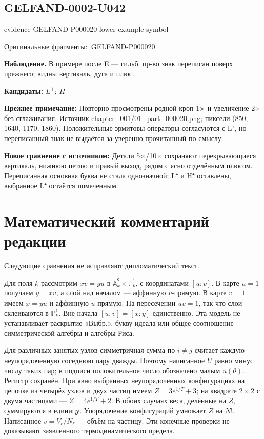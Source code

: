 \documentclass[11pt]{article}
\newcommand{\EvidenceBlock}[4]{%
 \par\smallskip\noindent\begin{minipage}{\linewidth}
 \begin{minipage}[t]{.47\linewidth}\vspace{0pt}\centering
 \csname evidence-#1-#2\endcsname\par
 {\scriptsize\SourceCropCaption\ #1}\par
 \end{minipage}\hfill
 \begin{minipage}[t]{.49\linewidth}\vspace{0pt}\raggedright
 {\small\color{orange!65!black}\textbf{#4} #3}\par
 \end{minipage}
 \end{minipage}\par\smallskip}
\newcommand{\SourceCropCaption}{Оригинальные фрагменты:}\newcommand{\ReadingCaption}{Сомнительное чтение.}\newcommand{\IncompleteCaption}{Неразобранный фрагмент.}\newcommand{\DiagramCaption}{Рисунок и набранное описание.}
\begin{document}
\subsection*{GELFAND-0002-U042}
\EvidenceBlock{GELFAND-P000020}{lower-example-symbol}{В примере после E — гильб. пр-во знак переписан поверх прежнего; видны вертикаль, дуга и плюс.}{Наблюдение.}
\par\smallskip\noindent\textbf{Кандидаты: } \(L^+\); \(H^+\)\par
\par\smallskip\noindent\textbf{Прежнее примечание: } Повторно просмотрены родной кроп 1× и увеличение 2× без сглаживания. Источник chapter\_001/01\_part\_000020.png; пиксели (850, 1640, 1170, 1860). Положительные эрмитовы операторы согласуются с L⁺, но переписанный знак не выдаётся за уверенно прочитанный по смыслу.\par
\par\smallskip\noindent\textbf{Новое сравнение с источником: } Детали 5×/10× сохраняют перекрывающиеся вертикаль, нижнюю петлю и правый выход, рядом с ясно отделённым плюсом. Переписанная основная буква не стала однозначной; L⁺ и H⁺ оставлены, выбранное L⁺ остаётся помеченным.\par
\clearpage\section*{Математический комментарий редакции}
Следующие сравнения не исправляют дипломатический текст.

Для поля \(k\) рассмотрим \(xv=yu\) в \(\mathbb A^2_k\times\mathbb P^1_k\), с координатами \([u:v]\). В карте \(u=1\) получаем \(y=xv\), а слой над началом — аффинную \(v\)-прямую. В карте \(v=1\) имеем \(x=yu\) и аффинную \(u\)-прямую. На пересечении \(uv=1\), так что слои склеиваются в \(\mathbb P^1_k\). Вне начала \([u:v]=[x:y]\) единственно. Эта модель не устанавливает раскрытие «Выбр.», букву идеала или общее соотношение симметрической алгебры и алгебры Риса.

Для различных занятых узлов симметричная сумма по \(i\ne j\) считает каждую неупорядоченную соседнюю пару дважды. Поэтому написанное \(U\) равно минус числу таких пар; в подписи положительное число обозначено малым \(u(\theta)\). Регистр сохранён. При явно выбранных неупорядоченных конфигурациях на цепочке из четырёх узлов и двух частиц имеем \(Z=3e^{1/T}+3\); на квадрате \(2\times2\) с двумя частицами — \(Z=4e^{1/T}+2\). В обоих случаях веса, делённые на \(Z\), суммируются в единицу. Упорядочение конфигураций умножает \(Z\) на \(N!\). Написанное \(v=V_\ell/N_\ell\) — объём на частицу. Эти конечные проверки не доказывают заявленного термодинамического предела.
\end{document}
